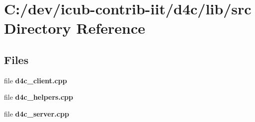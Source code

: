 \section{C\+:/dev/icub-\/contrib-\/iit/d4c/lib/src Directory Reference}
\label{dir_a065c5f60305fee3569f887679366939}
\subsection*{Files}
\begin{DoxyCompactItemize}
\item 
file {\bfseries d4c\+\_\+client.\+cpp}
\item 
file {\bfseries d4c\+\_\+helpers.\+cpp}
\item 
file {\bfseries d4c\+\_\+server.\+cpp}
\end{DoxyCompactItemize}
